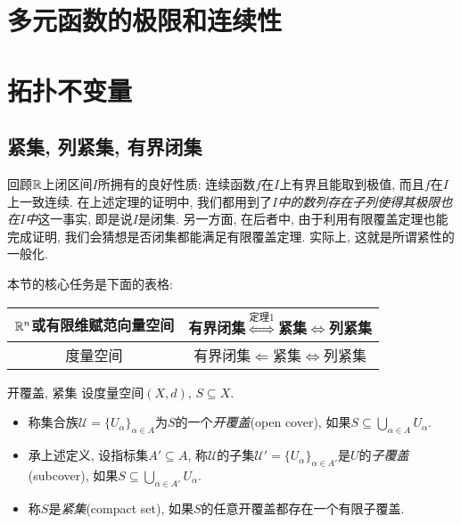 \newpage
\section{多元函数的极限和连续性}

\newpage
\section{拓扑不变量}

\subsection{紧集, 列紧集, 有界闭集}

回顾$\mathbb{R}$上闭区间$I$所拥有的良好性质: 连续函数$f$在$I$上有界且能取到极值, 而且$f$在$I$上一致连续. 在上述定理的证明中, 我们都用到了\textit{$I$中的数列存在子列使得其极限也在$I$中}这一事实, 即是说$I$是闭集. 另一方面, 在后者中, 由于利用有限覆盖定理也能完成证明, 我们会猜想是否闭集都能满足有限覆盖定理. 实际上, 这就是所谓紧性的一般化. 

本节的核心任务是下面的表格: 

\begin{table}[h]
	\centering
	\renewcommand\arraystretch{1.5}
	\begin{tabular}{|c|c|}
\hline
$\mathbb{R}^n$或有限维赋范向量空间 & 有界闭集$\stackrel{\textit{定理}1}{\Longleftrightarrow}$紧集$\Longleftrightarrow$列紧集 \\ \hline
度量空间             & 有界闭集$\Longleftarrow$紧集$\Longleftrightarrow$列紧集      \\ \hline
\end{tabular}
\end{table}

\begin{definition}{开覆盖, 紧集}
	设度量空间$(X,d)$, $S \subseteq X$. 
	\begin{itemize}
		\item 称集合族$\mathcal{U} = \{ U_{\alpha} \}_{\alpha \in A}$为$S$的一个\textit{开覆盖}(open cover), 如果$S \subseteq \bigcup_{\alpha \in A} U_{\alpha}$. 
		\item 承上述定义, 设指标集$A' \subseteq A$, 称$\mathcal{U}$的子集$\mathcal{U}'= \{ U_{\alpha} \}_{\alpha \in A'}$是$U$的\textit{子覆盖}(subcover), 如果$S \subseteq \bigcup_{\alpha \in A'} U_{\alpha}$. 
		\item 称$S$是\textit{紧集}(compact set), 如果$S$的任意开覆盖都存在一个有限子覆盖. 
	\end{itemize}
\end{definition}

